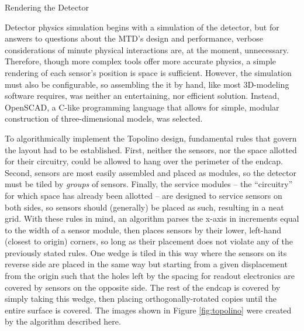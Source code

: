 \begin{section}{Rendering the Detector}

Detector physics simulation begins with a simulation of the detector, but for answers to questions about the MTD's design and performance, verbose considerations of minute physical interactions are, at the moment, unnecessary. Therefore, though more complex tools offer more accurate physics, a simple rendering of each sensor's position is space is sufficient. However, the simulation must also be configurable, so assembling the it by hand, like most 3D-modeling software requires, was neither an entertaining, nor efficient solution. Instead, OpenSCAD, a C-like programming language that allows for simple, modular construction of three-dimensional models, was selected.

To algorithmically implement the Topolino design, fundamental rules that govern the layout had to be established. First, neither the sensors, nor the space allotted for their circuitry, could be allowed to hang over the perimeter of the endcap. Second, sensors are most easily assembled and placed as modules, so the detector must be tiled by \textit{groups} of sensors. Finally, the service modules -- the ``circuitry'' for which space has already been allotted -- are designed to service sensors on both sides, so sensors should (generally) be placed as such, resulting in a neat grid. With these rules in mind, an algorithm parses the x-axis in increments equal to the width of a sensor module, then places sensors by their lower, left-hand (closest to origin) corners, so long as their placement does not violate any of the previously stated rules. One wedge is tiled in this way where the sensors on its reverse side are placed in the same way but starting from a given displacement from the origin such that the holes left by the spacing for readout electronics are covered by sensors on the opposite side. The rest of the endcap is covered by simply taking this wedge, then placing orthogonally-rotated copies until the entire surface is covered. The images shown in Figure \ref{fig:topolino} were created by the algorithm described here.

\end{section}

